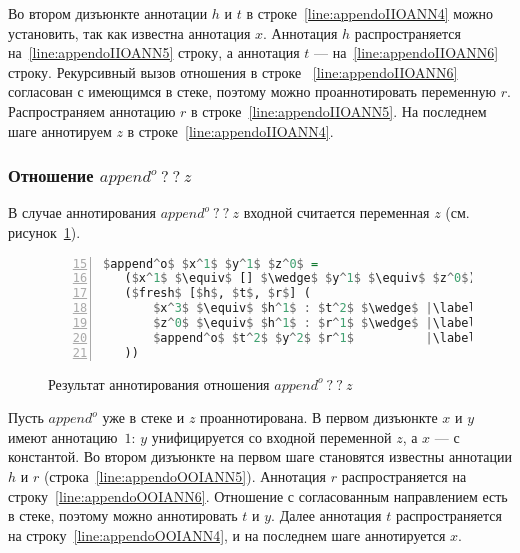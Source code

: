 Во втором дизъюнкте аннотации $h$ и $t$ в строке~\ref{line:appendoIIOANN4} можно установить, так как известна аннотация $x$.
Аннотация $h$ распространяется на~\ref{line:appendoIIOANN5} строку, а аннотация $t$ --- на~\ref{line:appendoIIOANN6} строку.
Рекурсивный вызов отношения в строке ~\ref{line:appendoIIOANN6} согласован с имеющимся в стеке, поэтому можно проаннотировать переменную $r$.
Распространяем аннотацию $r$ в строке~\ref{line:appendoIIOANN5}.
На последнем шаге аннотируем $z$ в строке~\ref{line:appendoIIOANN4}.


\subsubsection{Отношение $append^o \ ? \ ? \ z$}

В случае аннотирования $append^o \ ? \ ? \ z$ входной считается переменная $z$ (см. рисунок~\ref{lst:appendoOOIANN}).

\begin{figure}[h!]
  \begin{center}
  \begin{minipage}{0.5\textwidth}
  \begin{lstlisting}[language=Haskell, frame=single, numbers=left,numberstyle=\small, firstnumber=15, escapechar=|]
 $append^o$ $x^1$ $y^1$ $z^0$ =
   ($x^1$ $\equiv$ [] $\wedge$ $y^1$ $\equiv$ $z^0$) $\vee$ |\label{line:appendoOOIANN2}|
   ($fresh$ [$h$, $t$, $r$] (
       $x^3$ $\equiv$ $h^1$ : $t^2$ $\wedge$ |\label{line:appendoOOIANN4}|
       $z^0$ $\equiv$ $h^1$ : $r^1$ $\wedge$ |\label{line:appendoOOIANN5}|
       $append^o$ $t^2$ $y^2$ $r^1$          |\label{line:appendoOOIANN6}|
   ))
    \end{lstlisting}
  \end{minipage}
  \end{center}
  \caption{Результат аннотирования отношения $append^o \ ? \ ? \ z$}
  \label{lst:appendoOOIANN}
\end{figure}

Пусть $append^o$ уже в стеке и $z$ проаннотирована.
В первом дизъюнкте $x$ и $y$ имеют аннотацию~$1$: $y$ унифицируется со входной переменной $z$, а $x$ --- с константой.
Во втором дизъюнкте на первом шаге становятся известны аннотации $h$ и $r$ (строка~\ref{line:appendoOOIANN5}).
Аннотация $r$ распространяется на строку~\ref{line:appendoOOIANN6}.
Отношение с согласованным направлением есть в стеке, поэтому можно аннотировать $t$ и $y$.
Далее аннотация $t$ распространяется на строку~\ref{line:appendoOOIANN4}, и на последнем шаге аннотируется $x$.

